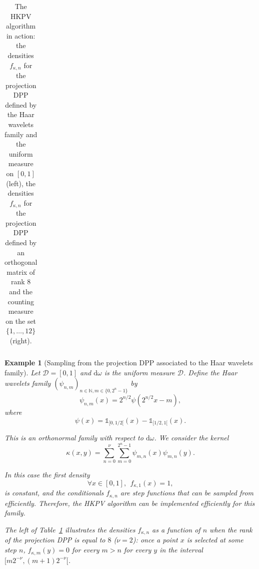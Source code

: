 \documentclass[twoside,11pt]{book}
\newtheorem{example}{Example}
\numberwithin{theorem}{chapter}
\numberwithin{definition}{chapter}
\numberwithin{proposition}{chapter}
\numberwithin{corollary}{chapter}
\numberwithin{example}{chapter}
\numberwithin{lemma}{chapter}
\numberwithin{assumption}{chapter}
\begin{document}
\begin{table}[]
\begin{tabular}{| c| c| c|}
\hline
\end{tabular}
\caption{The HKPV algorithm in action: the densities $f_{\kappa,n}$ for the projection DPP defined by the Haar wavelets family and the uniform measure on $[0,1]$(left), the densities $f_{\kappa,n}$ for the projection DPP defined by an orthogonal matrix of rank $8$ and the counting measure on the set $\{ 1, \dots, 12 \}$ (right).\label{table:HKPV_figures}}
\end{table}



\begin{example}[Sampling from the projection DPP associated to the Haar wavelets family]

Let $\mathcal{D} = [0,1]$ and $\mathrm{d}\omega$ is the uniform measure $\mathcal{D}$. Define the Haar wavelets family $(\psi_{n,m})_{n \in \mathbb{N}, m \in \{0,2^{n}-1\}}$ by
\begin{equation}
\psi_{n,m}(x) = 2^{n/2}\psi(2^{n/2}x - m),
\end{equation}
where
\begin{equation}
\psi(x) = \mathbb{1}_{[0,1/2[}(x) - \mathbb{1}_{[1/2,1[}(x).
\end{equation}

This is an orthonormal family with respect to $\mathrm{d}\omega$. We consider the kernel
\begin{equation}
\kappa(x,y) = \sum\limits_{n = 0}^{\nu}\sum\limits_{m=0}^{2^n-1} \psi_{m,n}(x)\psi_{m,n}(y).
\end{equation}

In this case the first density 
\begin{equation}
\forall x \in [0,1], \:\:f_{\kappa,1}(x) = 1,
\end{equation}
is constant, and the conditionals $f_{\kappa,n}$ are step functions that can be sampled from efficiently. Therefore, the HKPV algorithm can be implemented efficiently for this family.


The left of Table~\ref{table:HKPV_figures} illustrates the  densities $f_{\kappa,n}$ as a function of $n$ when the rank of the projection DPP is equal to $8$ ($\nu = 2$): once a point $x$ is selected at some step $n$, $f_{\kappa,m}(y) = 0$ for every $m>n$ for every $y$ in the interval $[m2^{-\nu},(m+1)2^{-\nu}[$.

 \end{example}
\end{document}
